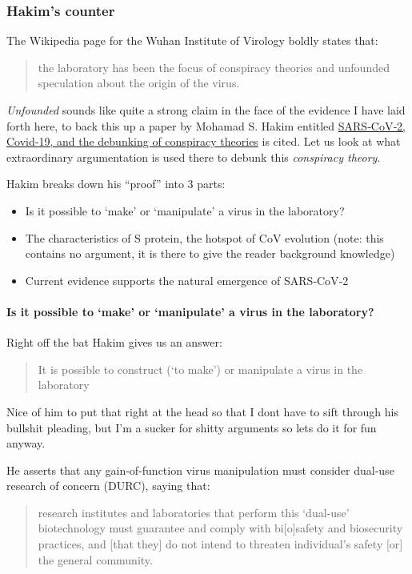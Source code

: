 \documentclass[11pt]{article}
\begin{document}
\subsubsection{Hakim's counter}
\label{sec:orga60ab16}
The Wikipedia page for the Wuhan Institute of Virology boldly states that:
\begin{quote}
the laboratory has been the focus of conspiracy theories and unfounded speculation about the origin of the virus.
\end{quote}

\emph{Unfounded} sounds like quite a strong claim in the face of the evidence I have laid forth here, to back this up a paper by Mohamad S. Hakim entitled \href{https://www.ncbi.nlm.nih.gov/pmc/articles/PMC7995093/}{SARS‐CoV‐2, Covid‐19, and the debunking of conspiracy theories} is cited. Let us look at what extraordinary argumentation is used there to debunk this \emph{conspiracy theory}.

Hakim breaks down his ``proof'' into 3 parts:
\begin{itemize}
\item Is it possible to ‘make’ or ‘manipulate’ a virus in the laboratory?
\item The characteristics of S protein, the hotspot of CoV evolution (note: this contains no argument, it is there to give the reader background knowledge)
\item Current evidence supports the natural emergence of SARS‐CoV‐2
\end{itemize}

\paragraph{Is it possible to ‘make’ or ‘manipulate’ a virus in the laboratory?}
\label{sec:org0cf8b38}
Right off the bat Hakim gives us an answer:
\begin{quote}
It is possible to construct (‘to make’) or manipulate a virus in the laboratory
\end{quote}
Nice of him to put that right at the head so that I dont have to sift through his bullshit pleading, but I'm a sucker for shitty arguments so lets do it for fun anyway.

He asserts that any gain-of-function virus manipulation must consider dual-use research of concern (DURC), saying that:
\begin{quote}
research institutes and laboratories that perform this ‘dual‐use’ biotechnology must guarantee and comply with bi[o]safety and biosecurity practices, and [that they] do not intend to threaten individual's safety [or] the general community.
\end{quote}
\end{document}
